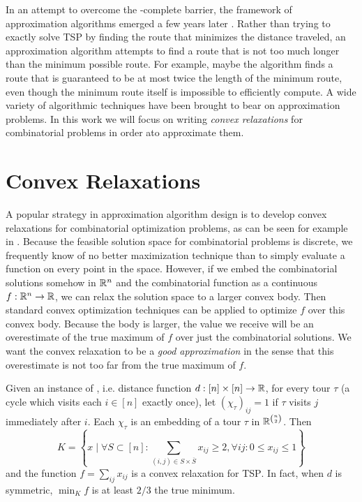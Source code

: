 In an attempt to overcome the \np-complete barrier, the framework of approximation algorithms emerged a few years later \cite{SG76}. Rather than trying to exactly solve \textsc{TSP} by finding the route that minimizes the distance traveled, an approximation algorithm attempts to find a route that is not too much longer than the minimum possible route. For example, maybe the algorithm finds a route that is guaranteed to be at most twice the length of the minimum route, even though the minimum route itself is impossible to efficiently compute. A wide variety of algorithmic techniques have been brought to bear on approximation problems. In this work we will focus on writing \emph{convex relaxations} for combinatorial problems in order ato approximate them.

\section{Convex Relaxations}
A popular strategy in approximation algorithm design is to develop convex relaxations for combinatorial optimization problems, as can be seen for example in \cite{GW95,ARV09,Li13,VY99}.
Because the feasible solution space for combinatorial problems is discrete, we frequently know of no better maximization technique than to simply evaluate a function on every point in the space. However, if we embed the combinatorial solutions somehow in $\mathbb R^n$ and the combinatorial function as a continuous $f: \mathbb R^n \rightarrow \mathbb R$, we can relax the solution space to a larger convex body. Then standard convex optimization techniques can be applied to optimize $f$ over this convex body. Because the body is larger, the value we receive will be an overestimate of the true maximum of $f$ over just the combinatorial solutions. We want the convex relaxation to be a \emph{good approximation} in the sense that this overestimate is not too far from the true maximum of $f$.

\begin{example}
Given an instance of , i.e. distance function $d: [n] \times [n] \rightarrow \mathbb R$, for every tour $\tau$ (a cycle which visits each $i \in [n]$ exactly once), let $(\chi_\tau)_{ij} = 1$ if $\tau$ visits $j$ immediately after $i$. Each $\chi_\tau$ is an embedding of a tour $\tau$ in $\mathbb R^{\binom{n}{2}}$. Then
\[K = \left\{x \mid \forall S \subset [n]: \sum_{(i,j) \in S \times \overline{S}} x_{ij} \geq 2, \forall ij: 0 \leq x_{ij} \leq 1\right\}\]
and the function $f = \sum_{ij} x_{ij}$ is a convex relaxation for \textsc{TSP}. In fact, when $d$ is symmetric, $\min_K f$ is at least $2/3$ the true minimum.
\end{example}

